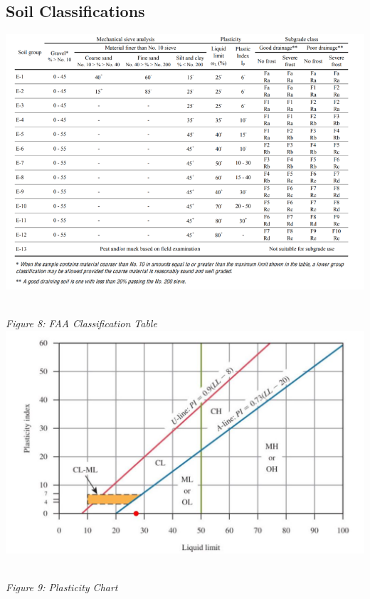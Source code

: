 \documentclass{article}
\begin{document}
\subsection{Soil Classifications}
\begin{center}
\includegraphics*[scale=0.5]{fig1.png}
\emph{\\Figure 8: FAA Classification Table\\}
\vspace{5mm}
\includegraphics*[scale=0.5]{fig2.png}
\emph{\\Figure 9: Plasticity Chart\\}
\vspace{10mm}

\end{center}
\end{document}
